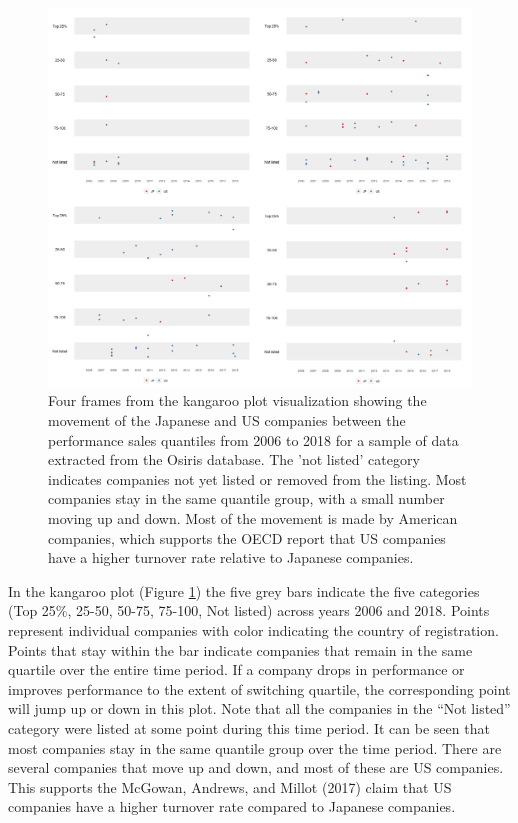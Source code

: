 \begin{figure}

{\centering \includegraphics[width=1\linewidth]{figures/osiris} 

}

\caption{Four frames from the kangaroo plot visualization showing the movement of the Japanese and US companies between the performance sales quantiles from 2006 to 2018 for a sample of data extracted from the Osiris database. The 'not listed' category indicates companies not yet listed or removed from the listing. Most companies stay in the same quantile group, with a small number moving up and down. Most of the movement is made by American companies, which supports the OECD report that US companies have a higher turnover rate relative to Japanese companies.}\label{fig:kan-osiris-figure}
\end{figure}

In the kangaroo plot (Figure \ref{fig:kan-osiris-figure}) the five grey bars indicate the five categories (Top 25\%, 25-50, 50-75, 75-100, Not listed) across years 2006 and 2018. Points represent individual companies with color indicating the country of registration. Points that stay within the bar indicate companies that remain in the same quartile over the entire time period. If a company drops in performance or improves performance to the extent of switching quartile, the corresponding point will jump up or down in this plot. Note that all the companies in the ``Not listed'' category were listed at some point during this time period. It can be seen that most companies stay in the same quantile group over the time period. There are several companies that move up and down, and most of these are US companies. This supports the McGowan, Andrews, and Millot (2017) claim that US companies have a higher turnover rate compared to Japanese companies.


